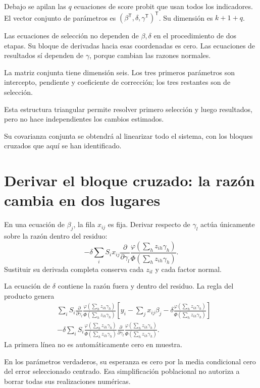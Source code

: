 \documentclass[11pt,a4paper]{article}
\newcommand{\T}{^{\mathsf T}}
\begin{document}
Debajo se apilan las \(q\)
ecuaciones de score probit
que usan todos los indicadores.
El vector conjunto de parámetros
es \((\beta\T,\delta,\gamma\T)\T\).
Su dimensión es \(k+1+q\).

Las ecuaciones de selección
no dependen de \(\beta,\delta\)
en el procedimiento de dos etapas.
Su bloque de derivadas hacia
esas coordenadas es cero.
Las ecuaciones de resultados
sí dependen de \(\gamma\),
porque cambian las razones normales.

\begin{ejemplo}
La matriz conjunta tiene dimensión seis.
Los tres primeros parámetros son
intercepto, pendiente y coeficiente
de corrección; los tres
restantes son de selección.
\end{ejemplo}
Esta estructura triangular
permite resolver primero
selección y luego resultados,
pero no hace independientes
los cambios estimados.

Su covarianza conjunta se
obtendrá al linearizar
todo el sistema,
con los bloques cruzados
que aquí se han identificado.

\clearpage
\section{Derivar el bloque cruzado: la razón cambia en dos lugares}\label{unidad136}
En una ecuación de \(\beta_j\),
la fila \(x_{ij}\) es fija.
Derivar respecto de \(\gamma_l\)
actúa únicamente sobre la
razón dentro del residuo:
\[
-\delta\sum_iS_ix_{ij}
\frac{\partial}{\partial\gamma_l}
\frac{\varphi(\sum_hz_{ih}\gamma_h)}
{\Phi(\sum_hz_{ih}\gamma_h)}.
\]
Sustituir su derivada completa
conserva cada \(z_{il}\)
y cada factor normal.

La ecuación de \(\delta\)
contiene la razón fuera
y dentro del residuo.
La regla del producto genera
\[
\begin{aligned}
&\sum_iS_i
\frac{\partial}{\partial\gamma_l}
\frac{\varphi(\sum_hz_{ih}\gamma_h)}
{\Phi(\sum_hz_{ih}\gamma_h)}
\left[
y_i-\sum_jx_{ij}\beta_j
-\delta\frac{\varphi(\sum_hz_{ih}\gamma_h)}
{\Phi(\sum_hz_{ih}\gamma_h)}
\right]\\
&-\delta\sum_iS_i
\frac{\varphi(\sum_hz_{ih}\gamma_h)}
{\Phi(\sum_hz_{ih}\gamma_h)}
\frac{\partial}{\partial\gamma_l}
\frac{\varphi(\sum_hz_{ih}\gamma_h)}
{\Phi(\sum_hz_{ih}\gamma_h)}.
\end{aligned}
\]
La primera línea no es
automáticamente cero en muestra.

En los parámetros verdaderos,
su esperanza es cero por
la media condicional cero
del error seleccionado centrado.
Esa simplificación poblacional
no autoriza a borrar
todas sus realizaciones numéricas.
\end{document}

